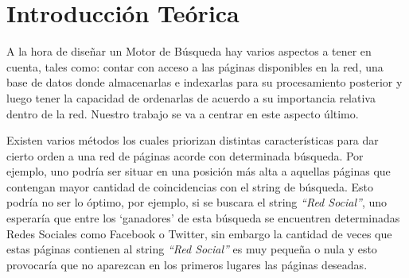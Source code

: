 \documentclass[a4paper]{article}
\begin{document}
\thispagestyle{empty}

\maketitle
\newpage

\thispagestyle{empty}
\vfill
\begin{abstract}
\textcolor{blue}{El resumen de no m\'as de 200 palabras, deber\'a explicar brevemente el trabajo realizado y las conclusiones de los autores de manera que pueda ser \'util por s\'i solo para dar una idea del contenido del trabajo.} \\
\\
\\
\indent \indent \textbf{Palabras claves} \\
\\
$\circ$ Matriz Esparsa \\
$\circ$ PageRank \\
$\circ$ HITS \\
$\circ$ In-deg \\

\end{abstract}

\thispagestyle{empty}
\vspace{3cm}
\tableofcontents
\newpage


\newpage

\section{Introducci\'on Te\'orica}

A la hora de dise\~nar un Motor de B\'usqueda hay varios aspectos a tener en cuenta, tales como: contar con acceso a las p\'aginas disponibles en la red, una base de datos donde almacenarlas e indexarlas para su procesamiento posterior y luego tener la capacidad de ordenarlas de acuerdo a su importancia relativa dentro de la red. Nuestro trabajo se va a centrar en este aspecto \'ultimo.

Existen varios m\'etodos los cuales priorizan distintas caracter\'isticas para dar cierto orden a una red de p\'aginas acorde con determinada b\'usqueda. Por ejemplo, uno podr\'ia ser situar en una posici\'on m\'as alta a aquellas p\'aginas que contengan mayor cantidad de coincidencias con el string de b\'usqueda. Esto podr\'ia no ser lo \'optimo, por ejemplo, si se buscara el string \textit{``Red Social''}, uno esperar\'ia que entre los `ganadores' de esta b\'usqueda se encuentren determinadas Redes Sociales como Facebook o Twitter, sin embargo la cantidad de veces que estas p\'aginas contienen al string \textit{``Red Social''} es muy peque\~na o nula y esto provocar\'ia que no aparezcan en los primeros lugares las p\'aginas deseadas.
\end{document}

